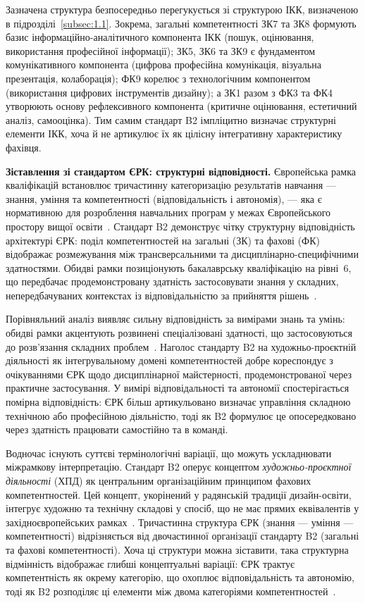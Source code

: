 Зазначена структура безпосередньо перегукується зі структурою ІКК, визначеною в підрозділі~\ref{subsec:1.1}. Зокрема, загальні компетентності ЗК7 та ЗК8 формують базис інформаційно-аналітичного компонента ІКК (пошук, оцінювання, використання професійної інформації); ЗК5, ЗК6 та ЗК9 є фундаментом комунікативного компонента (цифрова професійна комунікація, візуальна презентація, колаборація); ФК9 корелює з технологічним компонентом (використання цифрових інструментів дизайну); а ЗК1 разом з ФК3 та ФК4 утворюють основу рефлексивного компонента (критичне оцінювання, естетичний аналіз, самооцінка). Тим самим стандарт B2 імпліцитно визначає структурні елементи ІКК, хоча й не артикулює їх як цілісну інтегративну характеристику фахівця.

\textbf{Зіставлення зі стандартом ЄРК: структурні відповідності.} Європейська рамка кваліфікацій встановлює тричастинну категоризацію результатів навчання --- знання, уміння та компетентності (відповідальність і автономія), --- яка є нормативною для розроблення навчальних програм у межах Європейського простору вищої освіти~\cite{EuropeanCommission2017}. Стандарт B2 демонструє чітку структурну відповідність архітектурі ЄРК: поділ компетентностей на загальні (ЗК) та фахові (ФК) відображає розмежування між трансверсальними та дисциплінарно-специфічними здатностями. Обидві рамки позиціонують бакалаврську кваліфікацію на рівні~6, що передбачає продемонстровану здатність застосовувати знання у складних, непередбачуваних контекстах із відповідальністю за прийняття рішень~\cite{Musiienko2025DesignEducation}.

Порівняльний аналіз виявляє сильну відповідність за вимірами знань та умінь: обидві рамки акцентують розвинені спеціалізовані здатності, що застосовуються до розв'язання складних проблем~\cite{Bohlinger2012279}. Наголос стандарту B2 на художньо-проєктній діяльності як інтегрувальному домені компетентностей добре кореспондує з очікуваннями ЄРК щодо дисциплінарної майстерності, продемонстрованої через практичне застосування. У вимірі відповідальності та автономії спостерігається помірна відповідність: ЄРК більш артикульовано визначає управління складною технічною або професійною діяльністю, тоді як B2 формулює це опосередковано через здатність працювати самостійно та в команді.

Водночас існують суттєві термінологічні варіації, що можуть ускладнювати міжрамкову інтерпретацію. Стандарт B2 оперує концептом \emph{художньо-проєктної діяльності} (ХПД) як центральним організаційним принципом фахових компетентностей. Цей концепт, укорінений у радянській традиції дизайн-освіти, інтегрує художню та технічну складові у спосіб, що не має прямих еквівалентів у західноєвропейських рамках~\cite{Fursa2014}. Тричастинна структура ЄРК (знання --- уміння --- компетентності) відрізняється від двочастинної організації стандарту B2 (загальні та фахові компетентності). Хоча ці структури можна зіставити, така структурна відмінність відображає глибші концептуальні варіації: ЄРК трактує компетентність як окрему категорію, що охоплює відповідальність та автономію, тоді як B2 розподіляє ці елементи між двома категоріями компетентностей~\cite{Gehmlich2009736}.

